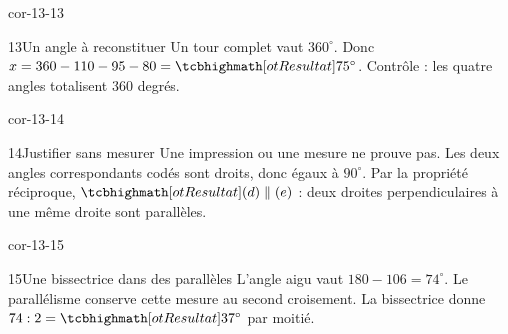 \begin{blocLivre}{cor-13-13}\begin{corrige}{13}{Un angle à reconstituer}
Un tour complet vaut $360^\circ$. Donc $x=360-110-95-80=\res{75^\circ}$. Contrôle : les quatre angles totalisent 360 degrés.
\label{fig-cor-13-13}
\end{corrige}\end{blocLivre}
\begin{blocLivre}{cor-13-14}\begin{corrige}{14}{Justifier sans mesurer}
Une impression ou une mesure ne prouve pas. Les deux angles correspondants codés sont droits, donc égaux à $90^\circ$. Par la propriété réciproque, $\res{(d)\parallel(e)}$ : deux droites perpendiculaires à une même droite sont parallèles.
\label{fig-cor-13-14}
\end{corrige}\end{blocLivre}
\begin{blocLivre}{cor-13-15}\begin{corrige}{15}{Une bissectrice dans des parallèles}
L’angle aigu vaut $180-106=74^\circ$. Le parallélisme conserve cette mesure au second croisement. La bissectrice donne $74:2=\res{37^\circ}$ par moitié.
\label{fig-cor-13-15}
\end{corrige}\end{blocLivre}
